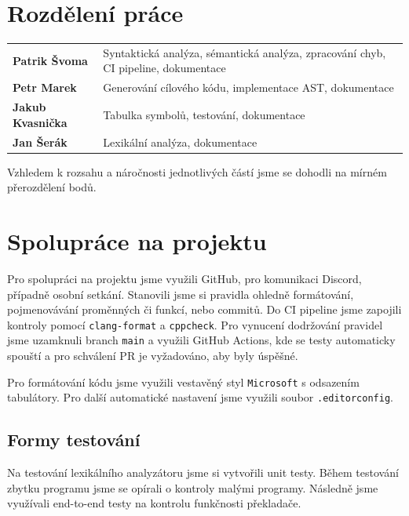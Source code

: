 \documentclass[11pt]{article}
\begin{document}
\section{Rozdělení práce} {
  \begin{tabularx}{\textwidth}{l | >{\raggedright\arraybackslash}X}
	  \textbf{Patrik Švoma}    & Syntaktická analýza, sémantická analýza, zpracování chyb, CI pipeline, dokumentace \\
	  \textbf{Petr Marek}      & Generování cílového kódu, implementace AST, dokumentace                            \\
	  \textbf{Jakub Kvasnička} & Tabulka symbolů, testování, dokumentace                                            \\
	  \textbf{Jan Šerák}       & Lexikální analýza, dokumentace                                                     \\
  \end{tabularx}

  Vzhledem k rozsahu a náročnosti jednotlivých částí jsme se dohodli na mírném přerozdělení bodů.
 }

\section{Spolupráce na projektu} {
  Pro spolupráci na projektu jsme využili GitHub, pro komunikaci Discord, případně osobní setkání.
  Stanovili jsme si pravidla ohledně formátování, pojmenovávání proměnných či funkcí, nebo commitů.
  Do CI pipeline jsme zapojili kontroly pomocí \texttt{clang-format} a \texttt{cppcheck}.
  Pro vynucení dodržování pravidel jsme uzamknuli branch \texttt{main} a využili GitHub Actions, kde se testy automaticky spouští a pro schválení PR je vyžadováno, aby byly úspěšné.
  \par
  Pro formátování kódu jsme využili vestavěný styl \texttt{Microsoft} s odsazením tabulátory. Pro další automatické nastavení jsme využili soubor \texttt{.editorconfig}.

  \subsection{Formy testování} {
	  Na testování lexikálního analyzátoru jsme si vytvořili unit testy. Během testování
	  zbytku programu jsme se opírali o kontroly malými programy. Následně jsme využívali
	  end-to-end testy na kontrolu funkčnosti překladače.
  }
 }
\end{document}
